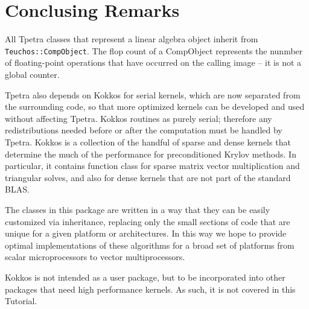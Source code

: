 \section{Conclusing Remarks}
\label{sec:tpetra_remarks}

All Tpetra classes that represent a linear algebra object inherit from {\tt
  Teuchos::CompObject}. The flop count of a CompObject represents the nunmber
  of floating-point operations that have occurred on the calling image -- it
  is not a global counter. 

\smallskip

Tpetra also depends on Kokkos for serial kernels, which are now
separated from the surrounding code, so that more optimized kernels can be
developed and used without affecting Tpetra. Kokkos routines as purely
serial; therefore any redistributions needed before or after the computation
must be handled by Tpetra. 
Kokkos is a collection of the handful of sparse and dense kernels that
determine the much of the performance for preconditioned Krylov methods. In
particular, it contains function class for sparse matrix vector multiplication
and triangular solves, and also for dense kernels that are not part of the
standard BLAS.

The classes in this package are written in a way that they can be easily
customized via inheritance, replacing only the small sections of code that are
unique for a given platform or architectures. In this way we hope to provide
optimal implementations of these algorithms for a broad set of platforms from
scalar microprocessors to vector multiprocessors.

Kokkos is not intended as a user package, but to be incorporated into other
packages that need high performance kernels. As such, it is not covered in
this Tutorial.
